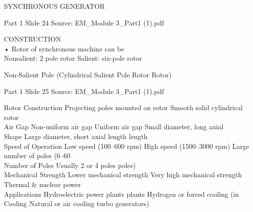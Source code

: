 \documentclass[11pt,a4paper]{article}
\begin{document}
\begin{mdframed}[roundcorner=9pt,backgroundcolor=white,linecolor=anthGreen,linewidth=1pt,innerleftmargin=12pt,innerrightmargin=12pt,innertopmargin=10pt,innerbottommargin=10pt,skipabove=8pt,skipbelow=10pt]
{\HeadingFont\fontsize{15}{18}\selectfont\color{anthDark}SYNCHRONOUS GENERATOR\par}
{\color{anthMid}\small Part 1 \textbullet{} Slide 24 \textbullet{} Source: EM\_Module 3\_Part1 (1).pdf\par}
\vspace{0.5em}
{\small
CONSTRUCTION\\
• Rotor of synchronous machine can be\\
Nonsalient: 2 pole rotor Salient: six-pole rotor\\

}
\end{mdframed}

\begin{mdframed}[roundcorner=9pt,backgroundcolor=white,linecolor=anthOrange,linewidth=1pt,innerleftmargin=12pt,innerrightmargin=12pt,innertopmargin=10pt,innerbottommargin=10pt,skipabove=8pt,skipbelow=10pt]
{\HeadingFont\fontsize{15}{18}\selectfont\color{anthDark}Non-Salient Pole (Cylindrical Salient Pole Rotor Rotor)\par}
{\color{anthMid}\small Part 1 \textbullet{} Slide 25 \textbullet{} Source: EM\_Module 3\_Part1 (1).pdf\par}
\vspace{0.5em}
{\small
\smallskip
Rotor Construction    Projecting poles mounted on rotor    Smooth solid cylindrical rotor\\
\smallskip
Air Gap               Non-uniform air gap                  Uniform air gap Small diameter, long axial\\
Shape                 Large diameter, short axial length length\\
\smallskip
Speed of Operation    Low speed (100–600 rpm)              High speed (1500–3000 rpm) Large number of poles (6–60\\
\smallskip
Number of Poles                                            Usually 2 or 4 poles poles)\\
\smallskip
Mechanical Strength   Lower mechanical strength            Very high mechanical strength Thermal \& nuclear power\\
\smallskip
Applications          Hydroelectric power plants plants Hydrogen or forced cooling (in\\
\smallskip
Cooling               Natural or air cooling turbo generators)\\

}
\end{mdframed}
\end{document}
